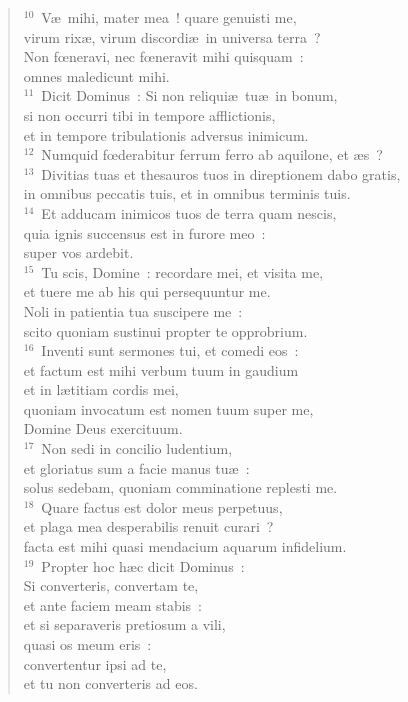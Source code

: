 \begin{verse}${}^{10}$~V\ae\ mihi, mater mea~! quare genuisti me,\\ virum rix\ae , virum discordi\ae\ in universa terra~?\\ Non fœneravi, nec fœneravit mihi quisquam~:\\ omnes maledicunt mihi.\\
${}^{11}$~Dicit Dominus~: Si non reliqui\ae\ tu\ae\ in bonum,\\ si non occurri tibi in tempore afflictionis,\\ et in tempore tribulationis adversus inimicum.\\
${}^{12}$~Numquid fœderabitur ferrum ferro ab aquilone, et \ae s~?\\
${}^{13}$~Divitias tuas et thesauros tuos in direptionem dabo gratis,\\ in omnibus peccatis tuis, et in omnibus terminis tuis.\\
${}^{14}$~Et adducam inimicos tuos de terra quam nescis,\\ quia ignis succensus est in furore meo~:\\ super vos ardebit.\\
${}^{15}$~Tu scis, Domine~: recordare mei, et visita me,\\ et tuere me ab his qui persequuntur me.\\ Noli in patientia tua suscipere me~:\\ scito quoniam sustinui propter te opprobrium.\\
${}^{16}$~Inventi sunt sermones tui, et comedi eos~:\\ et factum est mihi verbum tuum in gaudium\\ et in l\ae titiam cordis mei,\\ quoniam invocatum est nomen tuum super me,\\ Domine Deus exercituum.\\
${}^{17}$~Non sedi in concilio ludentium,\\ et gloriatus sum a facie manus tu\ae~:\\ solus sedebam, quoniam comminatione replesti me.\\
${}^{18}$~Quare factus est dolor meus perpetuus,\\ et plaga mea desperabilis renuit curari~?\\ facta est mihi quasi mendacium aquarum infidelium.\\
${}^{19}$~Propter hoc h\ae c dicit Dominus~:\\ Si converteris, convertam te,\\ et ante faciem meam stabis~:\\ et si separaveris pretiosum a vili,\\ quasi os meum eris~:\\ convertentur ipsi ad te,\\ et tu non converteris ad eos.\\

\end{verse}
